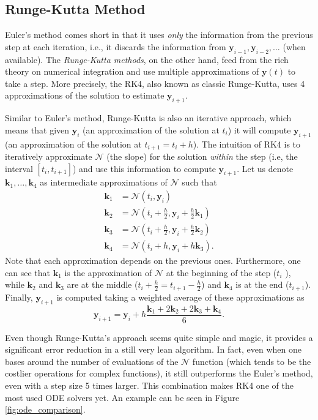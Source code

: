 \subsection{Runge-Kutta Method}

Euler's method comes short in that it uses \emph{only} the information from the previous step at each iteration, i.e., it discards the information from $\bm{y}_{i-1},\bm{y}_{i-2},\ldots$ (when available).
The \emph{Runge-Kutta methods}, on the other hand, feed from the rich theory on numerical integration and use multiple approximations of $\bm{y}\left( t \right)$ to take a step.
More precisely, the \gls{RK4}, also known as classic Runge-Kutta, uses 4 approximations of the solution to estimate $\bm{y}_{i+1}$.

Similar to Euler's method, Runge-Kutta is also an iterative approach, which means that given $\bm{y}_i$ (an approximation of the solution at $t_i$) it will compute $\bm{y}_{i+1}$ (an approximation of the solution at $t_{i+1}=t_i + h$).
The intuition of \gls{RK4} is to iteratively approximate $\mathcal{N}$ (the slope) for the solution \emph{within} the step (i.e, the interval $\left[ t_i,t_{i+1} \right] $) and use this information to compute $\bm{y}_{i+1}$.
Let us denote $\bm{k}_1,\ldots,\bm{k}_4$ as intermediate approximations of $\mathcal{N}$ such that
\begin{align*}
    \bm{k}_1 &= \mathcal{N}\left( t_i , \bm{y}_i \right)  \\
    \bm{k}_2 &= \mathcal{N}\left( t_i+\frac{h}{2}, \bm{y}_i + \frac{h}{2}\bm{k}_1 \right)  \\
    \bm{k}_3 &= \mathcal{N}\left( t_i+\frac{h}{2}, \bm{y}_i + \frac{h}{2}\bm{k}_2 \right)  \\
    \bm{k}_4 &= \mathcal{N}\left( t_i+h, \bm{y}_i + h \bm{k}_3 \right)
.\end{align*}
Note that each approximation depends on the previous ones.
Furthermore, one can see that $\bm{k}_1$ is the approximation of $\mathcal{N}$ at the beginning of the step ($t_i$ ), while $\bm{k}_2$ and $\bm{k}_3$ are at the middle ($t_i+\frac{h}{2}=t_{i+1}-\frac{h}{2}$) and $\bm{k}_4$ is at the end ($t_{i+1}$).
Finally, $\bm{y}_{i+1}$ is computed taking a weighted average of these approximations as \[
    \bm{y}_{i+1} = \bm{y}_i + h \frac{\bm{k}_1 + 2\bm{k}_2 + 2 \bm{k}_3 + \bm{k}_4}{6}
.\]

Even though Runge-Kutta's approach seems quite simple and magic, it provides a significant error reduction in a still very lean algorithm.
In fact, even when one bases around the number of evaluations of the $\mathcal{N}$ function (which tends to be the costlier operations for complex functions), it still outperforms the Euler's method, even with a step size 5 times larger\footnotemark.
This combination makes \gls{RK4} one of the most used ODE solvers yet.
An example can be seen in Figure \ref{fig:ode_comparison}.

